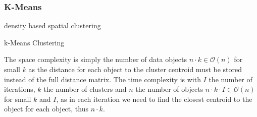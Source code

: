 \subsubsection{K-Means}
\begin{algorithm}[htp]density based spatial clustering 
    \hrulealg
\caption{k-Means Clustering}\label{kmeans}
\end{algorithm}
The space complexity is simply the number of data objects $n \cdot k \in \mathcal{O}(n)$ for small $k$ as the distance for each object to the cluster centroid must be stored instead of the full distance matrix. The time complexity is with $I$ the number of iterations, $k$ the number of clusters and $n$ the number of objects $n \cdot k \cdot I \in \mathcal{O}(n)$ for small $k$ and $I$, as in each iteration we need to find the closest centroid to the object for each object, thus $n \cdot k$.



